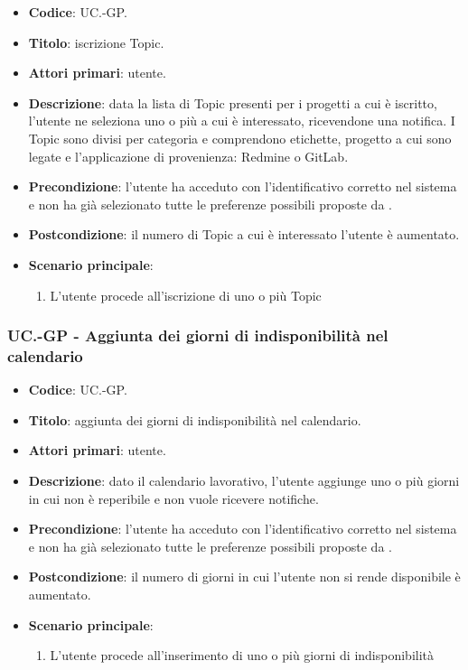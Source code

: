 		\begin{itemize}
			\item \textbf{Codice}: UC\theuccount.\thesubuccount-GP.
			\item \textbf{Titolo}: iscrizione Topic.
			\item \textbf{Attori primari}: utente.
			\item \textbf{Descrizione}: data la lista di Topic presenti per i progetti a cui è iscritto, l’utente ne seleziona uno o	più a cui è interessato, ricevendone una notifica. I Topic sono divisi per categoria e	comprendono etichette, progetto a cui sono legate e l'applicazione di provenienza: Redmine o GitLab.
			\item \textbf{Precondizione}: l'utente ha acceduto con l'identificativo corretto nel sistema e non ha già selezionato tutte le preferenze possibili proposte da \progetto.
			\item \textbf{Postcondizione}: il numero di Topic a cui è interessato l’utente è aumentato.
			\item \textbf{Scenario principale}:
			\begin{enumerate}
				\item L'utente procede all'iscrizione di uno o più Topic
			\end{enumerate}
		\end{itemize}

	\subsubsection{UC\theuccount.\thesubuccount-GP - Aggiunta dei giorni di indisponibilità nel calendario}

		\begin{itemize}
			\item \textbf{Codice}: UC\theuccount.\thesubuccount-GP.
			\item \textbf{Titolo}: aggiunta dei giorni di indisponibilità nel calendario.
			\item \textbf{Attori primari}: utente.
			\item \textbf{Descrizione}: dato il calendario lavorativo, l’utente aggiunge uno o più giorni in cui non è reperibile e non vuole ricevere notifiche.
			\item \textbf{Precondizione}: l'utente ha acceduto con l'identificativo corretto nel sistema e non ha già selezionato tutte le preferenze possibili proposte da \progetto.
			\item \textbf{Postcondizione}: il numero di giorni in cui l’utente non si rende disponibile è aumentato.
			\item \textbf{Scenario principale}:
			\begin{enumerate}
				\item L'utente procede all'inserimento di uno o più giorni di indisponibilità
			\end{enumerate}
		\end{itemize}

